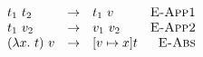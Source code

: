 \begin{minipage}{2.5in}
  \begin{math}
    \begin{array}{lclr}
      t_1\ t_2 & \rightarrow & t_1\ v & \text{\sc E-App1} \\
      t_1\ v_2 & \rightarrow & v_1\ v_2 & \text{\sc E-App2} \\
      (\lambda x.\ t)\ v & \rightarrow & [v \mapsto x] t & \text{\sc E-Abs}
    \end{array}
  \end{math}
\end{minipage}
